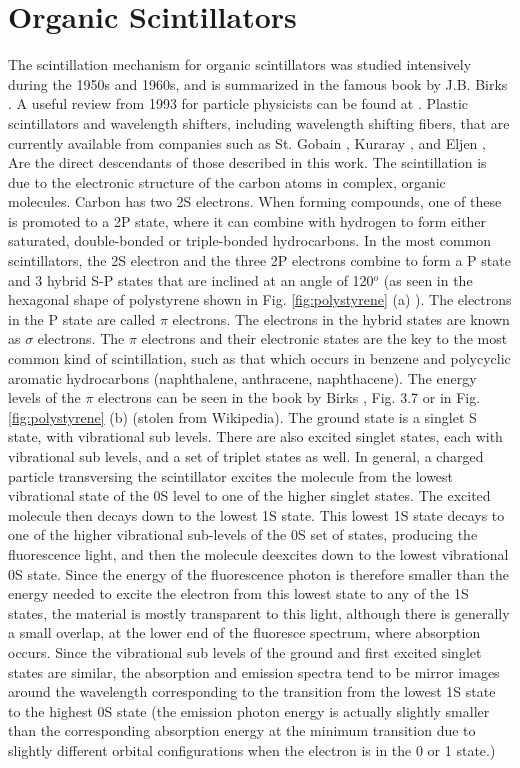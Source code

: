 \section{Organic Scintillators}
The scintillation mechanism for organic scintillators
was studied intensively during
the 1950s and 1960s, and is summarized in the famous book by
J.B. Birks \cite{birks}. 
A useful review from 1993 for particle physicists can be found at \cite{sauli}.
Plastic scintillators and wavelength shifters, including
wavelength shifting fibers, that are currently available
from companies such as St. Gobain \cite{stgobain}, Kuraray \cite{kuraray}, and 
Eljen \cite{eljen}, Are the direct descendants of those
described in this work.  The scintillation is due to the
electronic structure of the carbon atoms in complex, organic molecules.  
Carbon
has two 2S electrons.  When forming compounds, one of these is promoted
to a 2P state, where it can combine with hydrogen to
form either saturated, double-bonded or triple-bonded hydrocarbons.  
In the most common scintillators,
the 2S electron and the three 2P electrons combine to form a P state and 
3 hybrid S-P states that are inclined
at an angle of 120$^o$ (as seen in the hexagonal shape of
polystyrene shown in Fig. \ref{fig:polystyrene} (a) ).  
The electrons in the P state are called $\pi$ electrons.
The electrons in the hybrid states are
known as $\sigma$ electrons.
The $\pi$ electrons and their electronic states
are the key to the most common
kind of scintillation, such as that which occurs 
in benzene and polycyclic aromatic hydrocarbons (naphthalene, 
anthracene, naphthacene).  The energy levels of the $\pi$
electrons can be seen in the book by Birks \cite{birks}, Fig. 3.7
or in Fig. \ref{fig:polystyrene} (b) (stolen from Wikipedia).  The
ground state is a singlet S state, with vibrational sub levels. 
There are also excited singlet states, each with vibrational sub levels,
and a set of triplet states as well.  In general, a charged
particle transversing the scintillator
excites the molecule from the lowest vibrational state of the
0S level
to one of the higher singlet states.  The excited molecule
then decays down to the lowest 1S state.  This lowest 1S state decays to
one of the higher vibrational sub-levels of the 0S set of states,
producing the fluorescence light, and then the molecule
deexcites down to the lowest vibrational 0S state.  Since the energy of
the fluorescence photon is therefore smaller than the energy needed to
excite the electron from this lowest state to any of the 1S states,
the material is mostly transparent to this light, although
there is generally a small overlap, at the lower end of the 
fluoresce spectrum, where absorption occurs.  Since the
vibrational sub levels of the ground and first excited singlet 
states are similar, the absorption and emission spectra tend to
be mirror images around the wavelength corresponding to the transition
from the lowest 1S state to the highest 0S state (the
emission photon energy is actually slightly smaller than
the corresponding absorption energy at the minimum 
transition due to slightly different orbital configurations
when the electron is in the 0 or 1 state\cite{brown}.)

